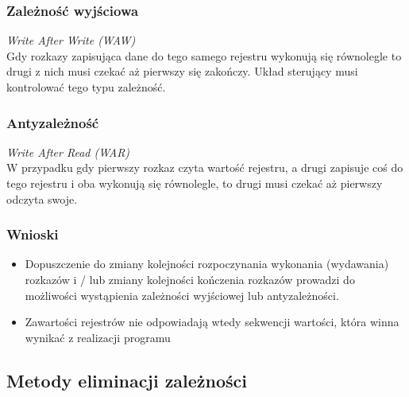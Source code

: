     	\subsubsection{Zależność wyjściowa}
    		\emph{Write After Write (WAW)}\\
    		Gdy rozkazy zapisująca dane do tego samego rejestru wykonują się równolegle to drugi z nich musi czekać aż pierwszy się zakończy. Układ sterujący musi kontrolować tego typu zależność.
		\subsubsection{Antyzależność}
	         \emph{Write After Read (WAR)}\\
	         W przypadku gdy pierwszy rozkaz czyta wartość rejestru, a drugi zapisuje coś do tego rejestru i oba wykonują się równolegle, to drugi musi czekać aż pierwszy odczyta swoje.
        \subsubsection{Wnioski}
	        \begin{itemize}
	           	\item Dopuszczenie do zmiany kolejności rozpoczynania wykonania (wydawania) rozkazów i / lub zmiany kolejności kończenia rozkazów prowadzi do możliwości wystąpienia zależności wyjściowej lub antyzależności.
	           	\item Zawartości rejestrów nie odpowiadają wtedy sekwencji wartości, która winna wynikać z realizacji programu
	        \end{itemize}
        
	\subsection{Metody eliminacji zależności}

